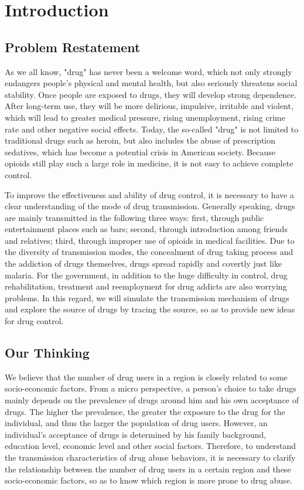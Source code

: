 \documentclass{mcmthesis}
\begin{document}
\tableofcontents

\newpage

\section{Introduction}
\subsection{Problem Restatement}
As we all know, "drug" has never been a welcome word, which not only strongly endangers people's physical and mental health, but also seriously threatens social stability. Once people are exposed to drugs, they will develop strong dependence. After long-term use, they will be more delirious, impulsive, irritable and violent, which will lead to greater medical pressure, rising unemployment, rising crime rate and other negative social effects. Today, the so-called "drug" is not limited to traditional drugs such as heroin, but also includes the abuse of prescription sedatives, which has become a potential crisis in American society. Because opioids still play such a large role in medicine, it is not easy to achieve complete control.\par
To improve the effectiveness and ability of drug control, it is necessary to have a clear understanding of the mode of drug transmission. Generally speaking, drugs are mainly transmitted in the following three ways: first, through public entertainment places such as bars; second, through introduction among friends and relatives; third, through improper use of opioids in medical facilities. Due to the diversity of transmission modes, the concealment of drug taking process and the addiction of drugs themselves, drugs spread rapidly and covertly just like malaria. For the government, in addition to the huge difficulty in control, drug rehabilitation, treatment and reemployment for drug addicts are also worrying problems. In this regard, we will simulate the transmission mechanism of drugs and explore the source of drugs by tracing the source, so as to provide new ideas for drug control.\par

\subsection{Our Thinking}
We believe that the number of drug users in a region is closely related to some socio-economic factors. From a micro perspective, a person's choice to take drugs mainly depends on the prevalence of drugs around him and his own acceptance of drugs. The higher the prevalence, the greater the exposure to the drug for the individual, and thus the larger the population of drug users. However, an individual's acceptance of drugs is determined by his family background, education level, economic level and other social factors. Therefore, to understand the transmission characteristics of drug abuse behaviors, it is necessary to clarify the relationship between the number of drug users in a certain region and these socio-economic factors, so as to know which region is more prone to drug abuse.
\end{document}

